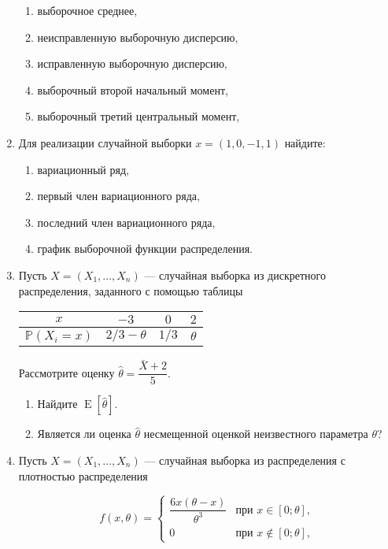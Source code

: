 \documentclass[12pt]{article}
\DeclareMathOperator{\E}{E}
\def \P{\mathbb{P}}
\begin{document}
\begin{enumerate}
\begin{enumerate}
\item выборочное среднее,
\item неисправленную выборочную дисперсию,
\item исправленную выборочную дисперсию,
\item выборочный второй начальный момент,
\item выборочный третий центральный момент,
\end{enumerate}

\item Для реализации случайной выборки $x=(1,0,-1,1)$ найдите:

\begin{enumerate}
\item вариационный ряд,
\item первый член вариационного ряда,
\item последний член вариационного ряда,
\item график выборочной функции распределения.
\end{enumerate}

\item Пусть $X=(X_1, \ldots,X_n)$ — случайная выборка из дискретного распределения, заданного с помощью таблицы

\begin{center}
\begin{tabular}{cccc}
\toprule
 $x$ & $-3$  &$ 0 $  & $2 $  \\ 
 \midrule
 $\P(X_i = x)$ & $2/3 - \theta$ & $1/3$ & $\theta$ \\ 
 \bottomrule
\end{tabular}
\end{center}

Рассмотрите оценку $\hat{\theta} = \dfrac{\bar{X}+2}{5}$.

\begin{enumerate}
    \item Найдите $\E[\hat{\theta}]$.
    \item Является ли оценка $\hat{\theta}$ несмещенной оценкой неизвестного параметра $\theta$?
\end{enumerate}

\item Пусть $X=(X_1, \ldots ,X_n)$ — случайная выборка из распределения с плотностью распределения

\[
f(x,\theta) = \begin{cases} 
\dfrac{6x(\theta - x)}{\theta^3} & \text{при } x \in [0;\theta], \\ 
0 & \text{при } x \not\in [0;\theta],
\end{cases}
\]



\end{enumerate}
\end{document}
